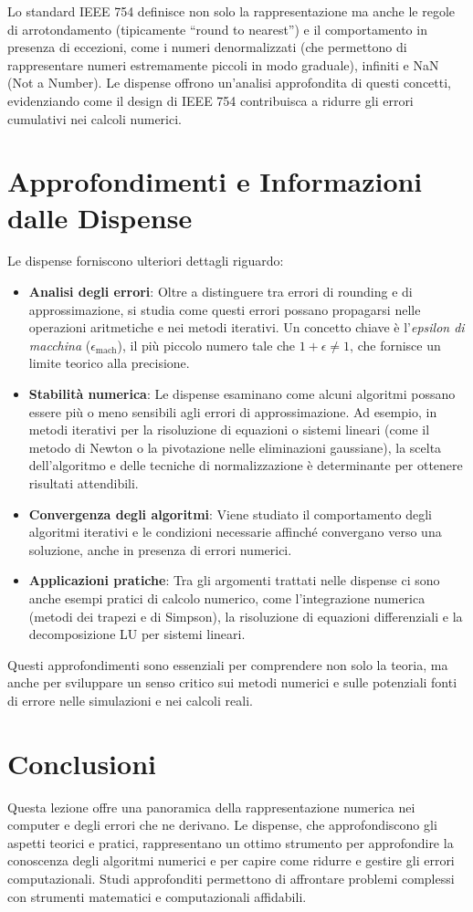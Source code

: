 \documentclass{article}
\begin{document}
        Lo standard IEEE 754 definisce non solo la rappresentazione ma anche le regole di arrotondamento (tipicamente ``round to nearest'') e il comportamento in presenza di eccezioni, come i numeri denormalizzati (che permettono di rappresentare numeri estremamente piccoli in modo graduale), infiniti e NaN (Not a Number). Le dispense offrono un’analisi approfondita di questi concetti, evidenziando come il design di IEEE 754 contribuisca a ridurre gli errori cumulativi nei calcoli numerici.

\section{Approfondimenti e Informazioni dalle Dispense}
    Le dispense forniscono ulteriori dettagli riguardo:
    \begin{itemize}
        \item \textbf{Analisi degli errori}: Oltre a distinguere tra errori di rounding e di approssimazione, si studia come questi errori possano propagarsi nelle operazioni aritmetiche e nei metodi iterativi. Un concetto chiave è l'\textit{epsilon di macchina} ($\epsilon_{\text{mach}}$), il più piccolo numero tale che $1+\epsilon \neq 1$, che fornisce un limite teorico alla precisione.
        \item \textbf{Stabilità numerica}: Le dispense esaminano come alcuni algoritmi possano essere più o meno sensibili agli errori di approssimazione. Ad esempio, in metodi iterativi per la risoluzione di equazioni o sistemi lineari (come il metodo di Newton o la pivotazione nelle eliminazioni gaussiane), la scelta dell'algoritmo e delle tecniche di normalizzazione è determinante per ottenere risultati attendibili.
        \item \textbf{Convergenza degli algoritmi}: Viene studiato il comportamento degli algoritmi iterativi e le condizioni necessarie affinché convergano verso una soluzione, anche in presenza di errori numerici.
        \item \textbf{Applicazioni pratiche}: Tra gli argomenti trattati nelle dispense ci sono anche esempi pratici di calcolo numerico, come l'integrazione numerica (metodi dei trapezi e di Simpson), la risoluzione di equazioni differenziali e la decomposizione LU per sistemi lineari.
    \end{itemize}

    Questi approfondimenti sono essenziali per comprendere non solo la teoria, ma anche per sviluppare un senso critico sui metodi numerici e sulle potenziali fonti di errore nelle simulazioni e nei calcoli reali.

\section{Conclusioni}
Questa lezione offre una panoramica della rappresentazione numerica nei computer e degli errori che ne derivano. Le dispense, che approfondiscono gli aspetti teorici e pratici, rappresentano un ottimo strumento per approfondire la conoscenza degli algoritmi numerici e per capire come ridurre e gestire gli errori computazionali. Studi approfonditi permettono di affrontare problemi complessi con strumenti matematici e computazionali affidabili.
\end{document}
